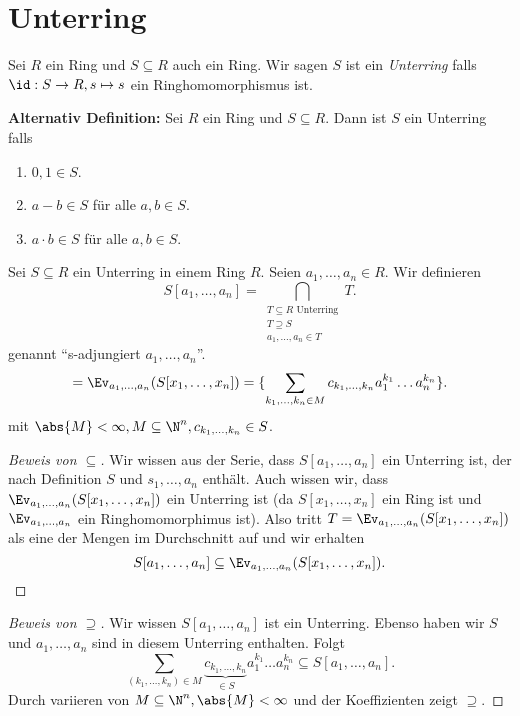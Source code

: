 \section{Unterring}
\begin{definition}
	Sei $R$ ein Ring und $S \subseteq R$ auch ein Ring. Wir sagen $S$ ist ein \emph{Unterring} falls $\id: S \to R, s \mapsto s$ 
	ein Ringhomomorphismus ist.
	
	\textbf{Alternativ Definition:}
	Sei $R$ ein Ring und $S \subseteq R$. Dann ist $S$ ein Unterring falls
	\begin{enumerate}
		\item $0,1 \in S$.
		\item $a-b \in S$ für alle $a,b \in S$.
		\item $a\cdot b \in S$ für alle $a,b \in S$.
	\end{enumerate}
\end{definition}

\begin{notation}
	Sei $S \subseteq R$ ein Unterring in einem Ring $R$.
	Seien $a_1,\ldots,a_{n} \in R$. Wir definieren
	\[
		S[a_1,\ldots,a_{n}] = \bigcap_{\substack{T \subseteq R \text{ Unterring}\\ T \supseteq S\\ a_1,\ldots,a_{n} \in T}} T 
	.\] 
	genannt \enquote{s-adjungiert $a_1,\ldots,a_{n}$}.
	\[
	= \Ev_{a_1,\ldots,a_{n}}(S[x_1,\ldots,x_{n}]) = \{\sum_{k_1,\ldots,k_{n} \in M} c_{k_1,\ldots,k_{n}} a_1^{k_1} \ldots a_{n}^{k_{n}} \} 
	.\] 
	mit $\abs{M} < \infty, M \subseteq \N^{n}, c_{k_1,\ldots,k_{n}} \in S$.
\end{notation}

\begin{proof}[Beweis von $\subseteq$]
	Wir wissen aus der Serie, dass $S[a_1,\ldots,a_{n}]$ ein Unterring ist, der nach Definition $S$ und $s_1,\ldots,a_{n}$ enthält.
	Auch wissen wir, dass $\Ev_{a_1,\ldots,a_{n}}(S[x_1,\ldots,x_{n}])$ ein Unterring ist (da $S[x_1,\ldots,x_{n}]$ ein Ring ist und $\Ev_{a_1,\ldots,a_{n}}$ ein Ringhomomorphimus ist).
	Also tritt $T = \Ev_{a_1,\ldots,a_{n}}(S[x_1,\ldots,x_{n}])$ als eine der Mengen im Durchschnitt auf und wir erhalten
	\[
		S[a_1,\ldots,a_{n}] \subseteq \Ev_{a_1,\ldots,a_{n}}(S[x_1,\ldots,x_{n}])
	.\] 
\end{proof}

\begin{proof}[Beweis von $\supseteq$]
	Wir wissen $S[a_1,\ldots,a_{n}]$ ist ein Unterring.
	Ebenso haben wir $S$ und $a_1,\ldots,a_{n}$ sind in diesem Unterring enthalten. Folgt
	\[
		\sum_{(k_1,\ldots,k_{n}) \in M} \underbrace{c_{k_1,\ldots,k_{n}}}_{\in S} a_1^{k_1} \ldots a_{n}^{k_{n}} \subseteq S[a_1,\ldots,a_{n}]
	.\] 
	Durch variieren von $M \subseteq \N^{n}, \abs{M} < \infty$ und der Koeffizienten zeigt $\supseteq$.
\end{proof}

